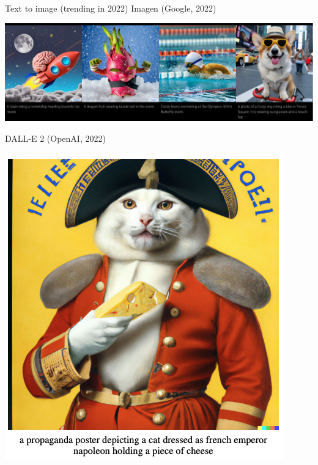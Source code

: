 \begin{frame}{Text to image (trending in 2022)}
\vspace{-5mm}
Imagen (Google, 2022) 
\begin{center}
    \includegraphics[height=0.5\textheight]{figures/applications/imagen_google.png}
\end{center}
DALL-E 2 (OpenAI, 2022) 
\begin{center}
\hspace{-20mm}
    \includegraphics[height=0.4\textheight]{figures/applications/dalle2_1.png}

\end{center}
\end{frame}
